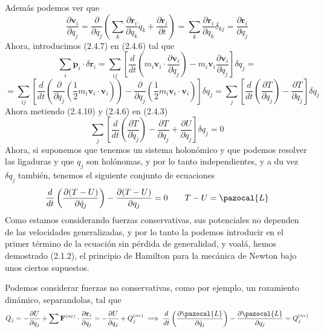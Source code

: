 Además podemos ver que
\begin{equation} \label{2.1.1}
    \frac{\partial \mathbf{v}_i}{\partial \dot{q}_j} = \frac{\partial}{\partial \dot{q}_j}\left( \sum_k \frac{\partial \mathbf{r}_i}{ \partial q_k}\dot{q}_k + \frac{\partial\mathbf{r}_i}{\partial t} \right) = \sum_k \frac{\partial \mathbf{r}_i}{ \partial q_k} \delta_{kj} =  \frac{\partial \mathbf{r}_i}{ \partial q_j}
\end{equation} 
Ahora, introducimos (2.4.7) en (2.4.6) tal que
\[\sum_i \dot{\mathbf{p}}_i \cdot \delta \mathbf{r}_i = \sum_{ij} \left[ \frac{d}{dt}\left(m_i \mathbf{v}_i \cdot \frac{\partial \mathbf{v}_i}{\partial \dot{q}_j}\right)- m_i \mathbf{v}_i\frac{\partial \mathbf{v}_i}{\partial q_j}\right] \delta q_j = \]
\begin{equation} \label{2.1.1}
     = \sum_{ij} \left[ \frac{d}{dt}\left(\frac{\partial}{\partial \dot{q}_j} \left(\frac{1}{2}m_i \mathbf{v}_i \cdot \mathbf{v}_i\right)\right)- \frac{\partial}{\partial q_j} \left(\frac{1}{2}m_i \mathbf{v}_i \cdot \mathbf{v}_i\right)\right] \delta q_j = \sum_{j} \left[ \frac{d}{dt}\left(\frac{\partial T}{\partial \dot{q}_j}\right)- \frac{\partial T}{\partial q_j}\right] \delta q_j
\end{equation} 
Ahora metiendo (2.4.10) y (2.4.6) en (2.4.3)
\begin{equation} \label{2.1.1}
    \sum_{j} \left[ \frac{d}{dt}\left(\frac{\partial T}{\partial \dot{q}_j}\right)- \frac{\partial T}{\partial q_j} +\frac{\partial U}{\partial q_j}\right] \delta q_j = 0
\end{equation} 
Ahora, si suponemos que tenemos un sistema holonómico y que podemos resolver las ligaduras y que $q_j$ son holónomas, y por lo tanto independientes, y a du vez $\delta q_j$ también, tenemos el siguiente conjunto de ecuaciones
\begin{equation} \label{2.1.1}
    \frac{d}{dt}\left(\frac{\partial (T-U)}{\partial \dot{q}_j}\right)-\frac{\partial (T-U)}{\partial q_j} = 0 \ \ \ \ \ \ T-U= \pazocal{L}
\end{equation} 
Como estamos considerando fuerzas conservativas, sus potenciales no dependen de las velocidades generalizadas, y por lo tanto la podemos introducir en el primer término de la ecuación sin pérdida de generalidad, y voalá, hemos demostrado (2.1.2), el principio de Hamilton para la mecánica de Newton bajo unos ciertos supuestos.

Podemos considerar fuerzas no conservativas, como por ejemplo, un rozamiento dinámico, separandolas, tal que
\begin{equation} \label{2.1.1}
    Q_j = - \frac{\partial U}{\partial q_j} + \sum \mathbf{F}^{(nc)} \cdot \frac{\partial \mathbf{r}_i}{\partial q_j} = - \frac{\partial U}{\partial q_j} + Q_j^{(nc)} \implies \frac{d}{dt}\left(\frac{\partial \pazocal{L}}{\partial \dot{q}_j}\right)-\frac{\partial \pazocal{L}}{\partial q_j} =  Q_j^{(nc)}
\end{equation} 
